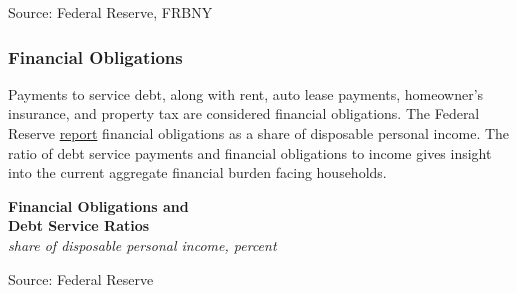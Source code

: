 \documentclass{report}
\makeatletter
\newcommand{\tbllink}[1]{\href{https://raw.githubusercontent.com/bdecon/US-chartbook/master/chartbook/data/#1}{\faTable}}
\newcommand*\short[1]{\expandafter\@gobbletwo\number\numexpr#1\relax}
\newcommand{\absnode}[3]{\node[below right, align=left] at (axis cs: #1,#2) {#3};}
\newcommand{\shdateaxisticks}{
		date coordinates in=x, axis line style={draw=none},
		xmax={2024-01-31},
		max space between ticks=40,	    
		xtick={{1990-01-01}, {1995-01-01}, {2000-01-01}, 
			{2005-01-01}, {2010-01-01}, {2015-01-01}, {2020-01-01}},
		minor xtick={},
		enlarge y limits={0.06}, enlarge x limits={0.01},
		xticklabel style={align=center, yshift=-2pt}, tick label style={inner sep=0pt},
		}
\newcommand{\bbar}[2]{extra #1 ticks = {{#2}}, extra #1 tick labels = ,
		extra #1 tick style = {grid=major, grid style={thick, black!25}},}
\newcommand{\stdline}[4]{\addplot[very thick, no markers, color=#1] 
		table [x=#2, y=#3, col sep=comma] {#4};	}
\newcommand{\rbars}{
		\fill[color=black!10] (axis cs:{1990-07-01},\pgfkeysvalueof{/pgfplots/ymin})
			rectangle (axis cs:{1991-03-01}, \pgfkeysvalueof{/pgfplots/ymax});
		\fill[color=black!10] (axis cs:{2007-12-01},\pgfkeysvalueof{/pgfplots/ymin})
			rectangle (axis cs:{2009-07-01}, \pgfkeysvalueof{/pgfplots/ymax});
		\fill[color=black!10] (axis cs:{2001-03-01},\pgfkeysvalueof{/pgfplots/ymin})
			rectangle (axis cs:{2001-11-01}, \pgfkeysvalueof{/pgfplots/ymax});
		\fill[color=black!10] (axis cs:{2020-02-01},\pgfkeysvalueof{/pgfplots/ymin})
			rectangle (axis cs:{2020-05-01}, \pgfkeysvalueof{/pgfplots/ymax});}
\makeatother
\begin{document}
{\begin{minipage}{1.0\textwidth}
\footnotesize{Source: Federal Reserve, FRBNY} \hfill \tbllink{cc_dpi_monthly.csv} \tbllink{hhcdebt.csv}
\vspace{3mm}
\subsubsection*{Financial Obligations}  
\small Payments to service debt, along with rent, auto lease payments, homeowner's insurance, and property tax are considered financial obligations. The Federal Reserve \href{https://www.federalreserve.gov/releases/housedebt/default.htm}{report} financial obligations as a share of disposable personal income. The ratio of debt service payments and financial obligations to income gives insight into the current aggregate financial burden facing households. 
\end{minipage}

\begin{minipage}{0.34\textwidth}
\small  
\end{minipage} \hspace{6mm}
\begin{minipage}{0.37\textwidth}
\normalsize \textbf{Financial Obligations and}\\
\normalsize \textbf{Debt Service Ratios}\\
\footnotesize{\textit{share of disposable personal income, percent}}
\vspace{5.2cm}

\hspace{2mm} 

\footnotesize{Source: Federal Reserve} \hfill \tbllink{for.csv} 
\end{minipage}
\newpage
\vspace*{-9mm}

}
\end{document}
